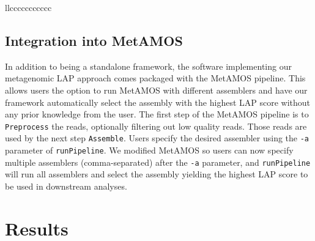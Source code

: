 \begin{landscape}
\begin{table}[tbp]
\begin{tabular}{{l}{l}{c}{c}{c}{c}{c}{c}{c}{c}{c}{c}{c}}
\hline
\end{tabular}
\caption[Comparison of assembly statistics for HMP mock Even and mock Staggered datasets]{Comparison of assembly statistics for HMP mock Even and mock Staggered datasets.Numbers in bold represent the best value for the specific dataset.}
\label{tab:hmp}
\end{table}

\renewcommand{\baselinestretch}{2}
\small\normalsize
\end{landscape}


\subsection{Integration into MetAMOS}

In addition to being a standalone framework, the software implementing our metagenomic LAP approach comes packaged with the MetAMOS pipeline.
This allows users the option to run MetAMOS with different assemblers and have our framework automatically select the assembly with the highest LAP score without any prior knowledge from the user.
The first step of the MetAMOS pipeline is to \verb!Preprocess! the reads, optionally filtering out low quality reads.
Those reads are used by the next step \verb!Assemble!.
Users specify the desired assembler using the \verb!-a! parameter of \verb!runPipeline!.
We modified MetAMOS so users can now specify multiple assemblers (comma-separated) after the \verb!-a! parameter, and \verb!runPipeline! will run all assemblers and select the assembly yielding the highest LAP score to be used in downstream analyses.


\section{Results}
